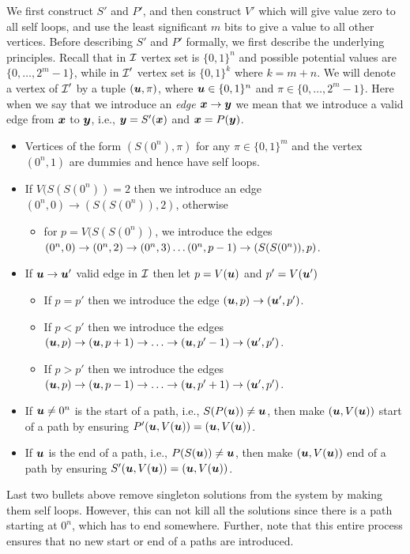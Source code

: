 We first construct $S'$ and $P'$, and then construct $V'$ which will give
value zero to all self loops, and use the least significant $m$ bits to give a
value to all other vertices.
Before describing $S'$ and $P'$ formally, we first describe the underlying
principles. Recall that in $\mbox{${\mathcal I}$}$ vertex set is $\{0,1\}^n$ and possible potential values are $\{0,\dots,2^m-1\}$, while in $\mbox{${\mathcal I}$}'$ vertex set is $\{0,1\}^k$ where $k=m+n$. 
We will denote a vertex of $\mbox{${\mathcal I}$}'$ by a tuple $(\mbox{\boldmath $u$},\pi)$, where $\mbox{\boldmath $u$} \in
\{0,1\}^n$ and $\pi\in \{0,\dots,2^m-1\}$. 
Here when we say that we introduce an {\em edge $\mbox{\boldmath $x$}\rightarrow \mbox{\boldmath $y$}$} we mean
that we introduce a valid edge from $\mbox{\boldmath $x$}$ to $\mbox{\boldmath $y$}$, i.e., $\mbox{\boldmath $y$}=S'(\mbox{\boldmath $x$})$ and $\mbox{\boldmath $x$}=P(\mbox{\boldmath $y$})$. 
\begin{itemize}
\item Vertices of the form $(S(0^n),\pi)$ for any $\pi \in \{0,1\}^m$ and the vertex $(0^n,1)$ are
dummies and hence have self loops.
\item If $V(S(S(0^n))=2$ then we introduce an edge $(0^n,0)\rightarrow(S(S(0^n)),2)$, otherwise 
\begin{itemize}
\item for $p=V(S(S(0^n))$, we introduce the edges $(0^n,0)\rightarrow (0^n,2)\rightarrow (0^n, 3)\dots (0^n,p-1)\rightarrow (S(S(0^n)),p)$.
\end{itemize}
\item If $\mbox{\boldmath $u$} \rightarrow \mbox{\boldmath $u$}'$ valid edge in $\mbox{${\mathcal I}$}$ then let $p=V(\mbox{\boldmath $u$})$ and $p'=V(\mbox{\boldmath $u$}')$
\begin{itemize}
\item If $p=p'$ then we introduce the edge $(\mbox{\boldmath $u$},p)\rightarrow (\mbox{\boldmath $u$}',p')$. %
\item If $p<p'$ then we introduce the edges $(\uu,p)\ra (\uu,p+1)\ra \dots\ra (\uu,p'-1)\ra (\uu',p')$.
\item If $p>p'$ then we introduce the edges $(\uu,p)\ra (\uu,p-1)\ra \dots\ra (\uu,p'+1)\ra (\uu',p')$.
\end{itemize}
\item If $\mbox{\boldmath $u$}\neq 0^n$ is the start of a path, i.e., $S(P(\mbox{\boldmath $u$}))\neq \mbox{\boldmath $u$}$, then
make $(\mbox{\boldmath $u$},V(\mbox{\boldmath $u$}))$ start of a path by ensuring $P'(\mbox{\boldmath $u$},V(\mbox{\boldmath $u$}))=(\mbox{\boldmath $u$},V(\mbox{\boldmath $u$}))$.
\item If $\mbox{\boldmath $u$}$ is the end of a path, i.e., $P(S(\mbox{\boldmath $u$}))\neq \mbox{\boldmath $u$}$, then make
$(\mbox{\boldmath $u$},V(\mbox{\boldmath $u$}))$ end of a path by ensuring $S'(\mbox{\boldmath $u$},V(\mbox{\boldmath $u$}))=(\mbox{\boldmath $u$},V(\mbox{\boldmath $u$}))$.
\end{itemize}

Last two bullets above remove singleton solutions from the system by making them
self loops. However, this can not kill all the solutions since there is a path
starting at $0^n$, which has to end somewhere. Further, note that this entire process ensures that no new start or end of a paths are introduced. 
\medskip
\medskip

